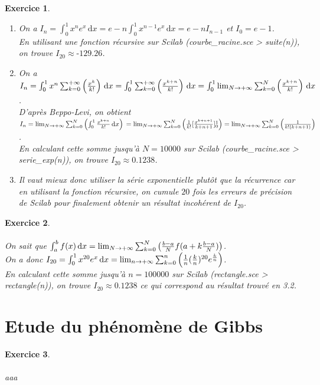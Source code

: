 \documentclass[a4paper,11pt]{article}
\newtheorem{exo}{Exercice}
\begin{document}
\begin{exo} \ \\
\begin{enumerate}
\item On a $ I_n=\int_{0}^{1} x^ne^x \, \mathrm{d}x = e-n\int_{0}^{1} x^{n-1}e^x \, \mathrm{d}x = e-nI_{n-1} $ et $ I_0=e-1 $. \ \\
En utilisant une fonction récursive sur Scilab (courbe\_racine.sce > suite(n)), on trouve $ I_{20}\approx\text{-}129.26 $.
\item On a $ I_n = \int_{0}^{1} x^n\sum_{k=0}^{\text{+}\infty} \left (\frac{x^k}{k!} \right) \, \mathrm{d}x = \int_{0}^{1} \sum_{k=0}^{\text{+}\infty} \left (\frac{x^{k+n}}{k!} \right) \, \mathrm{d}x = \int_{0}^{1} \lim_{N\to\\{\text{+}\infty}}\sum_{k=0}^{N} \left (\frac{x^{k+n}}{k!} \right) \, \mathrm{d}x $. \ \\
D'après Beppo-Levi, on obtient $ I_n = \lim_{N\to\\{\text{+}\infty}}\sum_{k=0}^{N} \left(\int_{0}^{1} \frac{x^{k+n}}{k!} \, \mathrm{d}x \right) \newline = \lim_{N\to\\{\text{+}\infty}}\sum_{k=0}^{N} \left(\frac{1}{k!}[\frac{x^{k+n+1}}{k+n+1}]_0^1 \right) = \lim_{N\to\\{\text{+}\infty}}\sum_{k=0}^{N} \left(\frac{1}{k!(k+n+1)} \right) $. \ \\
En calculant cette somme jusqu'à $ N=10000 $ sur Scilab (courbe\_racine.sce > serie\_exp(n)), on trouve $ I_{20}\approx0.1238 $.
\item Il vaut mieux donc utiliser la série exponentielle plutôt que la récurrence car en utilisant la fonction récursive, on cumule $ 20 $ fois les erreurs de précision de Scilab pour finalement obtenir un résultat incohérent de $ I_{20} $.
\end{enumerate}
\end{exo}

\begin{exo} \ \\ \\
On sait que $ \int_{a}^{b} f(x) \, \mathrm{d}x = \lim_{N\to\\{\text{+}\infty}}\sum_{k=0}^{N} \left(\frac{b-a}{N}f(a+k\frac{b-a}{N}) \right) $. \ \\
On a donc $ I_{20} = \int_{0}^{1} x^{20}e^x \, \mathrm{d}x = \lim_{n\to\\{\text{+}\infty}}\sum_{k=0}^{n} \left(\frac{1}{n}(\frac{k}{n})^{20}e^{\frac{k}{n}} \right) $. \ \\
En calculant cette somme jusqu'à $ n=100000 $ sur Scilab (rectangle.sce > rectangle(n)), on trouve $ I_{20}\approx0.1238 $ ce qui correspond au résultat trouvé en 3.2.
\end{exo}

\section{Etude du phénomène de Gibbs}

\begin{exo} \ \\ \\
aaa
\end{exo}

\end{document}
